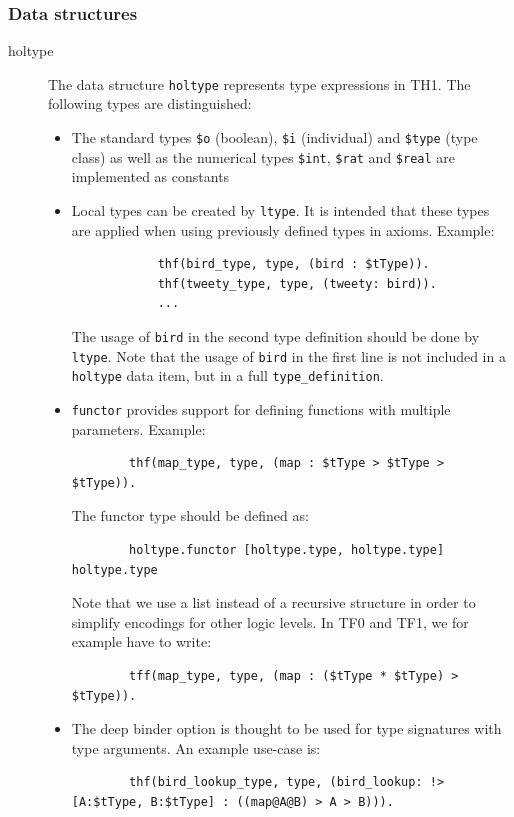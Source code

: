 \documentclass[a4paper]{article}
\begin{document}
\subsubsection{Data structures} 
\begin{description}
	\item[holtype] The data structure \texttt{holtype} represents type expressions in TH1. The following types are distinguished:
	\begin{itemize}
		\item The standard types \texttt{\$o} (boolean), \texttt{\$i} (individual) and \texttt{\$type} (type class) as well as the numerical types \texttt{\$int}, \texttt{\$rat} and \texttt{\$real} are implemented as constants
		\item Local types can be created by \texttt{ltype}. It is intended that these types are applied when using previously defined types in axioms. Example:
		\begin{verbatim}
			thf(bird_type, type, (bird : $tType)).
			thf(tweety_type, type, (tweety: bird)).
			...
		\end{verbatim}
		The usage of \texttt{bird} in the second type definition should be done by \texttt{ltype}. Note that the usage of \texttt{bird} in the first line is not included in a \texttt{holtype} data item, but in a full \texttt{type\_definition}. 
		\item \texttt{functor} provides support for defining functions with multiple parameters. Example:
		\begin{verbatim}
		thf(map_type, type, (map : $tType > $tType > $tType)).
		\end{verbatim}
		The functor type should be defined as:
		\begin{verbatim}
		holtype.functor [holtype.type, holtype.type] holtype.type
		\end{verbatim}
		Note that we use a list instead of a recursive structure in order to simplify encodings for other logic levels. In TF0 and TF1, we for example have to write: 
		\begin{verbatim}
		tff(map_type, type, (map : ($tType * $tType) > $tType)).
		\end{verbatim}
		\item The deep binder option is thought to be used for type signatures with type arguments. An example use-case is:
		\begin{verbatim}
		thf(bird_lookup_type, type, (bird_lookup: !>[A:$tType, B:$tType] : ((map@A@B) > A > B))).
		\end{verbatim}

\end{itemize}
\end{description}
\end{document}
